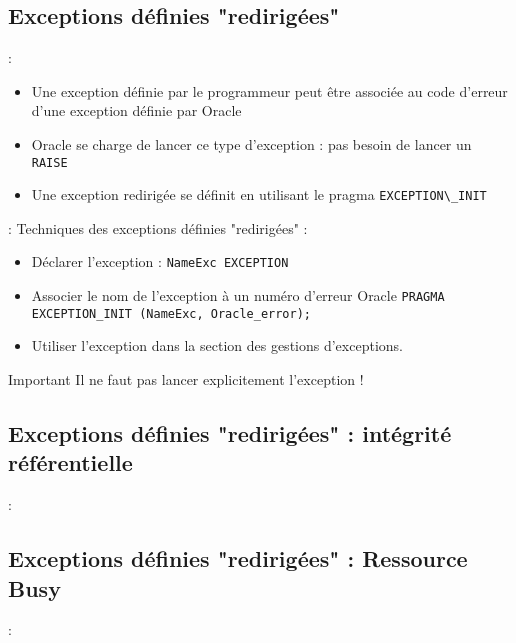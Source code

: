 \documentclass[10pt]{beamer}
\begin{document}
\subsection{Exceptions définies "redirigées"}
\begin{frame}{\secname : \subsecname}
    \begin{itemize}
        \item Une exception définie par le programmeur peut être associée au code d'erreur d'une exception définie par Oracle
        \item Oracle se charge de lancer ce type d'exception : pas besoin de lancer un \lstinline[language=plsql]!RAISE!
        \item Une exception redirigée se définit en utilisant le pragma \lstinline[language=plsql]!EXCEPTION\_INIT!
    \end{itemize}
\end{frame}

\begin{frame}{\secname : \subsecname}
    Techniques des exceptions définies "redirigées" :
    \begin{itemize}
        \item Déclarer l'exception : \lstinline[language=plsql]!NameExc EXCEPTION!
        \item Associer le nom de l'exception à un numéro d'erreur Oracle \lstinline[language=plsql]!PRAGMA EXCEPTION_INIT (NameExc, Oracle_error);!
        \item Utiliser l'exception dans la section des gestions d'exceptions.
    \end{itemize}
    \begin{alertblock}{Important}
        Il ne faut pas lancer explicitement l'exception !
    \end{alertblock}
\end{frame}

\subsection{Exceptions définies "redirigées" : intégrité référentielle}
\begin{frame}{\secname : \subsecname}
    
\end{frame}

\subsection{Exceptions définies "redirigées" : Ressource Busy}
\begin{frame}{\secname : \subsecname}
    
\end{frame}
\end{document}
